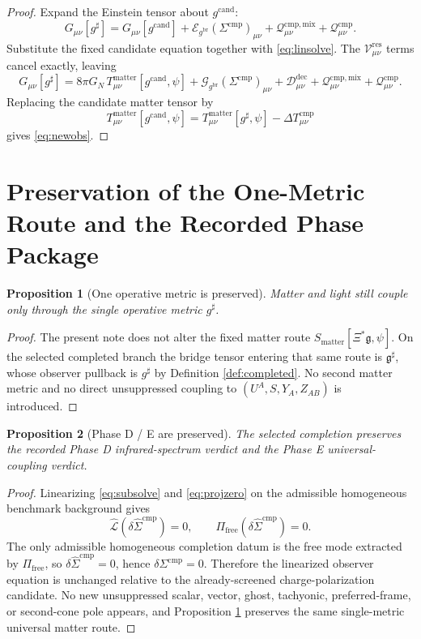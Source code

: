\documentclass[11pt]{article}
\newcommand{\ObserverMap}{\Xi}
\newcommand{\BridgeMetric}{\mathfrak g}
\newcommand{\ObserverMetric}{g^{\mathrm{br}}}
\newcommand{\CandidateMetric}{g^{\mathrm{cand}}}
\newcommand{\CompletedMetric}{g^{\sharp}}
\newcommand{\CompShift}{\Sigma^{\mathrm{cmp}}}
\newcommand{\CompLift}{\widehat\Sigma^{\mathrm{cmp}}}
\newcommand{\ResidualCore}{\mathcal V_{\mu\nu}^{\mathrm{res}}}
\newcommand{\ResidualDec}{\mathcal D_{\mu\nu}^{\mathrm{dec}}}
\newcommand{\SubReducedEin}{\widehat{\mathcal L}}
\newcommand{\FreeProj}{\Pi_{\mathrm{free}}}
\newcommand{\GaugeAux}{Y}
\newcommand{\ModeAux}{Z}
\newcommand{\GaugeBook}{\mathcal G_{\ObserverMetric}}
\newcommand{\EinLin}{\mathcal E_{\ObserverMetric}}
\newcommand{\CompMix}{\mathcal Q_{\mu\nu}^{\mathrm{cmp,mix}}}
\newcommand{\CompQuad}{\mathcal Q_{\mu\nu}^{\mathrm{cmp}}}
\newcommand{\DeltaTComp}{\Delta T_{\mu\nu}^{\mathrm{cmp}}}
\newcommand{\MatterAct}{S_{\mathrm{matter}}}
\newtheorem{proposition}{Proposition}
\begin{document}
\begin{proof}
Expand the Einstein tensor about \(\CandidateMetric\):
\[
G_{\mu\nu}[\CompletedMetric]
=
G_{\mu\nu}[\CandidateMetric]
+\EinLin(\CompShift)_{\mu\nu}
+\CompMix+\CompQuad.
\]
Substitute the fixed candidate equation together with \eqref{eq:linsolve}. The \(\ResidualCore\) terms cancel exactly, leaving
\[
G_{\mu\nu}[\CompletedMetric]
=
8\pi G_N\,T_{\mu\nu}^{\mathrm{matter}}[\CandidateMetric,\psi]
+\GaugeBook(\CompShift)_{\mu\nu}
+\ResidualDec+\CompMix+\CompQuad.
\]
Replacing the candidate matter tensor by
\[
T_{\mu\nu}^{\mathrm{matter}}[\CandidateMetric,\psi]
=
T_{\mu\nu}^{\mathrm{matter}}[\CompletedMetric,\psi]-\DeltaTComp
\]
gives \eqref{eq:newobs}.
\end{proof}

\section{Preservation of the One-Metric Route and the Recorded Phase Package}

\begin{proposition}[One operative metric is preserved]
\label{prop:onemetric}
Matter and light still couple only through the single operative metric \(\CompletedMetric\).
\end{proposition}

\begin{proof}
The present note does not alter the fixed matter route \(\MatterAct[\ObserverMap^*\BridgeMetric,\psi]\). On the selected completed branch the bridge tensor entering that same route is \(\BridgeMetric^\sharp\), whose observer pullback is \(\CompletedMetric\) by Definition \ref{def:completed}. No second matter metric and no direct unsuppressed coupling to \((U^A,S,\GaugeAux_A,\ModeAux_{AB})\) is introduced.
\end{proof}

\begin{proposition}[Phase D / E are preserved]
\label{prop:phaseDE}
The selected completion preserves the recorded Phase D infrared-spectrum verdict and the Phase E universal-coupling verdict.
\end{proposition}

\begin{proof}
Linearizing \eqref{eq:subsolve} and \eqref{eq:projzero} on the admissible homogeneous benchmark background gives
\[
\SubReducedEin(\delta\CompLift)=0,
\qquad
\FreeProj(\delta\CompLift)=0.
\]
The only admissible homogeneous completion datum is the free mode extracted by \(\FreeProj\), so \(\delta\CompLift=0\), hence \(\delta\CompShift=0\). Therefore the linearized observer equation is unchanged relative to the already-screened charge-polarization candidate. No new unsuppressed scalar, vector, ghost, tachyonic, preferred-frame, or second-cone pole appears, and Proposition \ref{prop:onemetric} preserves the same single-metric universal matter route.
\end{proof}
\end{document}
